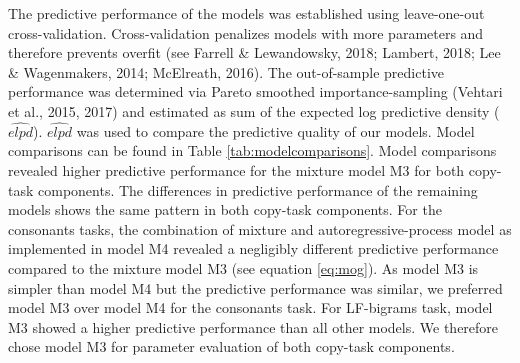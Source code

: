 \documentclass[
  english,
  man,mask,floatsintext]{apa7}
\begin{document}
The predictive performance of the models was established using leave-one-out cross-validation. Cross-validation penalizes models with more parameters and therefore prevents overfit (see Farrell \& Lewandowsky, 2018; Lambert, 2018; Lee \& Wagenmakers, 2014; McElreath, 2016). The out-of-sample predictive performance was determined via Pareto smoothed importance-sampling (Vehtari et al., 2015, 2017) and estimated as sum of the expected log predictive density (\(\widehat{elpd}\)). \(\widehat{elpd}\) was used to compare the predictive quality of our models. Model comparisons can be found in Table \ref{tab:modelcomparisons}. Model comparisons revealed higher predictive performance for the mixture model M3 for both copy-task components. The differences in predictive performance of the remaining models shows the same pattern in both copy-task components. For the consonants tasks, the combination of mixture and autoregressive-process model as implemented in model M4 revealed a negligibly different predictive performance compared to the mixture model M3 (see equation \ref{eq:mog}). As model M3 is simpler than model M4 but the predictive performance was similar, we preferred model M3 over model M4 for the consonants task. For LF-bigrams task, model M3 showed a higher predictive performance than all other models. We therefore chose model M3 for parameter evaluation of both copy-task components.
\end{document}
